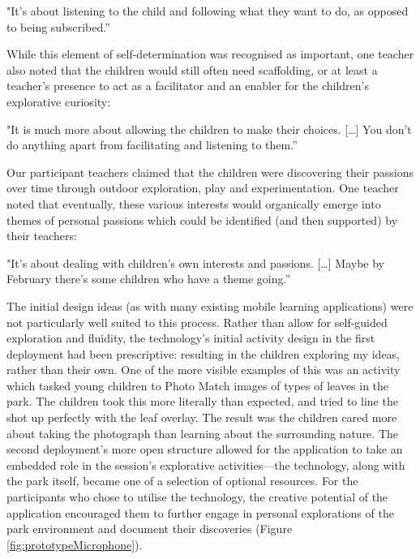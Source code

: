 \begin{displayquote}
"It's about listening to the child and following what they want to do, as opposed to being subscribed.”
\end{displayquote}

While this element of self-determination was recognised as important, one teacher also noted that the children would still often need scaffolding, or at least a teacher’s presence to act as a facilitator and an enabler for the children’s explorative curiosity:

\begin{displayquote}
"It is much more about allowing the children to make their choices. […] You don’t do anything apart from facilitating and listening to them.”
\end{displayquote}

Our participant teachers claimed that the children were discovering their passions over time through outdoor exploration, play and experimentation. One teacher noted that eventually, these various interests would organically emerge into themes of personal passions which could be identified (and then supported) by their teachers:

\begin{displayquote}
"It’s about dealing with children’s own interests and passions. […] Maybe by February there’s some children who have a theme going.”
\end{displayquote}

The initial design ideas (as with many existing mobile learning applications) were not particularly well suited to this process. Rather than allow for self-guided exploration and fluidity, the technology’s initial activity design in the first deployment had been prescriptive: resulting in the children exploring my ideas, rather than their own. One of the more visible examples of this was an activity which tasked young children to Photo Match images of types of leaves in the park. The children took this more literally than expected, and tried to line the shot up perfectly with the leaf overlay. The result was the children cared more about taking the photograph than learning about the surrounding nature. The second deployment’s more open structure allowed for the application to take an embedded role in the session’s explorative activities---the technology, along with the park itself, became one of a selection of optional resources. For the participants who chose to utilise the technology, the creative potential of the application encouraged them to further engage in personal explorations of the park environment and document their discoveries (Figure \ref{fig:prototypeMicrophone}).

